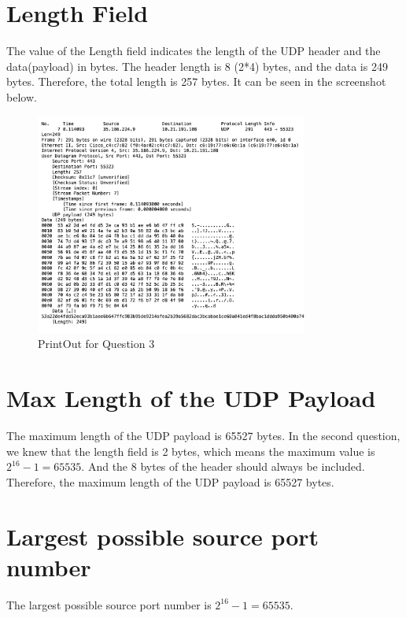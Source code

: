 \documentclass{article}
\begin{document}
\section{Length Field}
The value of the Length field indicates the length of the UDP header and the data(payload) in bytes.
The header length is 8 (2*4) bytes, and the data is 249 bytes. Therefore, the total length is 257 bytes.
It can be seen in the screenshot below.
\begin{figure}[H]
    \centering
    \includegraphics[width=0.8\textwidth]{Q3 - PrintOut.png}
    \caption{PrintOut for Question 3}
\end{figure}

\section{Max Length of the UDP Payload}
The maximum length of the UDP payload is 65527 bytes. In the second question,
we knew that the length field is 2 bytes, which means the maximum value is $2^{16} - 1 = 65535$.
And the 8 bytes of the header should always be included. Therefore, the maximum length of the UDP payload is 65527 bytes.

\section{Largest possible source port number}
The largest possible source port number is $2^{16} - 1 = 65535$.
\end{document}
